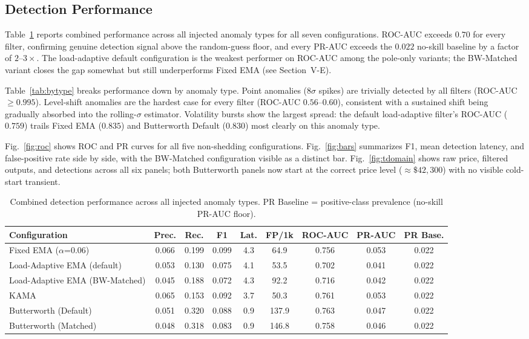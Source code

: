 \documentclass[conference]{IEEEtran}
\begin{document}
\subsection{Detection Performance}
Table~\ref{tab:combined} reports combined performance across all injected
anomaly types for all seven configurations. ROC-AUC exceeds $0.70$ for
every filter, confirming genuine detection signal above the random-guess
floor, and every PR-AUC exceeds the $0.022$ no-skill baseline by a factor
of $2$--$3\times$. The load-adaptive default configuration is the weakest
performer on ROC-AUC among the pole-only variants; the BW-Matched
variant closes the gap somewhat but still underperforms Fixed EMA (see
Section~V-E).

Table~\ref{tab:bytype} breaks performance down by anomaly type. Point
anomalies ($8\sigma$ spikes) are trivially detected by all filters
(ROC-AUC $\ge 0.995$). Level-shift anomalies are the hardest case for
every filter (ROC-AUC $0.56$--$0.60$), consistent with a sustained shift
being gradually absorbed into the rolling-$\sigma$ estimator. Volatility
bursts show the largest spread: the default load-adaptive filter's
ROC-AUC ($0.759$) trails Fixed EMA ($0.835$) and Butterworth Default
($0.830$) most clearly on this anomaly type.

Fig.~\ref{fig:roc} shows ROC and PR curves for all five non-shedding
configurations. Fig.~\ref{fig:bars} summarizes F1, mean detection
latency, and false-positive rate side by side, with the BW-Matched
configuration visible as a distinct bar. Fig.~\ref{fig:tdomain} shows
raw price, filtered outputs, and detections across all six panels; both
Butterworth panels now start at the correct price level ($\approx\$42{,}300$)
with no visible cold-start transient.

\begin{table}[t]
\centering
\caption{Combined detection performance across all injected anomaly types.
PR Baseline = positive-class prevalence (no-skill PR-AUC floor).}
\label{tab:combined}
\footnotesize
\begin{tabular}{lcccccccc}
\hline
\textbf{Configuration} & \textbf{Prec.} & \textbf{Rec.} & \textbf{F1}
  & \textbf{Lat.} & \textbf{FP/1k} & \textbf{ROC-AUC}
  & \textbf{PR-AUC} & \textbf{PR Base.} \\
\hline
Fixed EMA ($\alpha$=0.06)            & 0.066 & 0.199 & 0.099 & 4.3 & 64.9  & 0.756 & 0.053 & 0.022 \\
Load-Adaptive EMA (default)          & 0.053 & 0.130 & 0.075 & 4.1 & 53.5  & 0.702 & 0.041 & 0.022 \\
Load-Adaptive EMA (BW-Matched)       & 0.045 & 0.188 & 0.072 & 4.3 & 92.2  & 0.716 & 0.042 & 0.022 \\
KAMA                                 & 0.065 & 0.153 & 0.092 & 3.7 & 50.3  & 0.761 & 0.053 & 0.022 \\
Butterworth (Default)                & 0.051 & 0.320 & 0.088 & 0.9 & 137.9 & 0.763 & 0.047 & 0.022 \\
Butterworth (Matched)                & 0.048 & 0.318 & 0.083 & 0.9 & 146.8 & 0.758 & 0.046 & 0.022 \\
\hline
\end{tabular}
\end{table}
\end{document}
